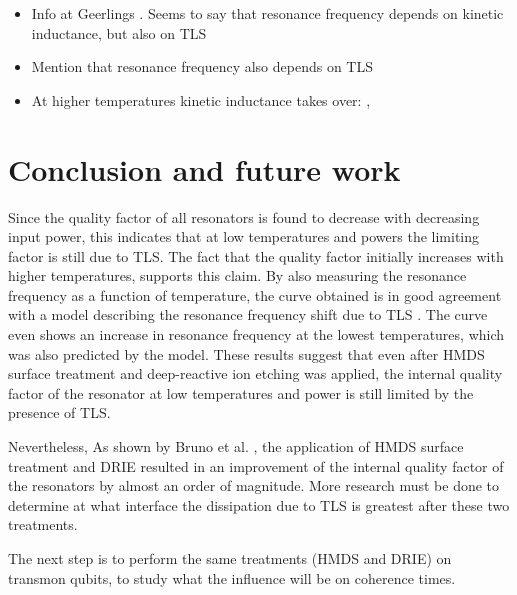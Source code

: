 \documentclass[12pt]{report}
\begin{document}
\begin{itemize}
    \item Info at Geerlings \cite[p.~106]{Geerlings}. Seems to say that resonance frequency depends on kinetic inductance, but also on TLS
    \item Mention that resonance frequency also depends on TLS
    \item At higher temperatures kinetic inductance takes over: \cite{barends2008contribution}, \cite[ch.~3]{Gao}
\end{itemize}



\section{Conclusion and future work}

Since the quality factor of all resonators is found to decrease with decreasing input power, this indicates that at low temperatures and powers the limiting factor is still due to TLS. The fact that the quality factor initially increases with higher temperatures, supports this claim. By also measuring  the resonance frequency as a function of temperature, the curve obtained is in good agreement with a model describing the resonance frequency shift due to TLS \cite{gao2008experimental}. The curve even shows an increase in resonance frequency at the lowest temperatures, which was also predicted by the model. These results suggest that even after HMDS surface treatment and deep-reactive ion etching was applied, the internal quality factor of the resonator at low temperatures and power is still limited by the presence of TLS.

Nevertheless, As shown by Bruno et al. \cite{DRIE}, the application of HMDS surface treatment and DRIE resulted in an improvement of the internal quality factor of the resonators by almost an order of magnitude. More research must be done to determine at what interface the dissipation due to TLS is greatest after these two treatments.

The next step is to perform the same treatments (HMDS and DRIE) on transmon qubits, to study what the influence will be on coherence times.



\end{document}
